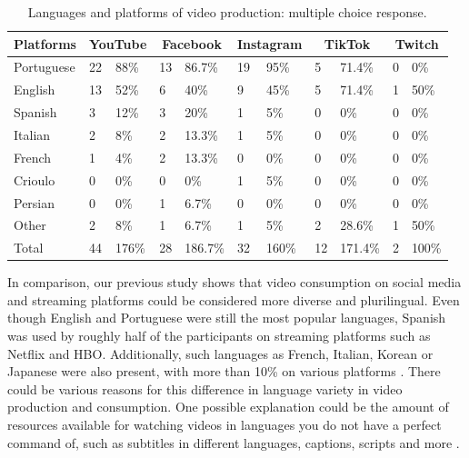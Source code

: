 \begin{table}[htbp]
\centering
\begin{threeparttable}
\caption{Languages and platforms of video production: multiple choice response.}
\label{tab-04}
\begin{tabular}{*{11}{l}}
\toprule
Platforms & \multicolumn{2}{c}{YouTube} & \multicolumn{2}{c}{Facebook} &  \multicolumn{2}{c}{Instagram} & \multicolumn{2}{c}{TikTok} & \multicolumn{2}{c}{Twitch} \\
\midrule
Portuguese & 22 & 88\% & 13 & 86.7\% & 19 & 95\% & 5 & 71.4\% & 0 & 0\% \\
English    & 13 & 52\% & 6  & 40\%   & 9  & 45\% & 5 & 71.4\% & 1 & 50\% \\
Spanish    & 3  & 12\% & 3  & 20\%   & 1  & 5\%  & 0 & 0\%    & 0 & 0\% \\
Italian    & 2  & 8\%  & 2  & 13.3\% & 1  & 5\%  & 0 & 0\%    & 0 & 0\% \\
French     & 1  & 4\%  & 2  & 13.3\% & 0  & 0\%  & 0 & 0\%    & 0 & 0\% \\
Crioulo    & 0  & 0\%  & 0  & 0\%    & 1  & 5\%  & 0 & 0\%    & 0 & 0\% \\
Persian    & 0  & 0\%  & 1  & 6.7\%  & 0  & 0\%  & 0 & 0\%    & 0 & 0\% \\
Other      & 2  & 8\%  & 1  & 6.7\%  & 1  & 5\%  & 2 & 28.6\% & 1 & 50\% \\
\rule{0pt}{3ex}%
Total & 44 & 176\% & 28 & 186.7\% & 32 & 160\% & 12 & 171.4\% & 2 & 100\% \\
\bottomrule
\end{tabular}
\end{threeparttable}
\end{table}




In comparison, our previous study shows that video consumption on social
media and streaming platforms could be considered more diverse and
plurilingual. Even though English and Portuguese were still the most
popular languages, Spanish was used by roughly half of the participants
on streaming platforms such as Netflix and HBO. Additionally, such
languages as French, Italian, Korean or Japanese were also present, with
more than 10\% on various platforms \cite{shafirova2023}. There
could be various reasons for this difference in language variety in
video production and consumption. One possible explanation could be the
amount of resources available for watching videos in languages you do
not have a perfect command of, such as subtitles in different languages,
captions, scripts and more \cite{shafirova2023}.

